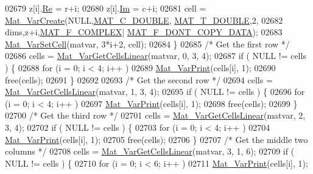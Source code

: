\begin{DoxyCode}
{{{{{{{{02679         z[i].\hyperlink{group___m_a_t_a484a93607508adac2bce53a0252e0325}{Re} = r+i;
02680         z[i].\hyperlink{group___m_a_t_a7182d10b0d3598415887376065440946}{Im} = c+i;
02681         cell = \hyperlink{group___m_a_t_ga1c54a84bb4d810c6fccdb8869489eac4}{Mat\_VarCreate}(NULL,\hyperlink{group___m_a_t_ggad4d60ae7b709fc81bfd744fb4c857c40a5d70e0862e5bdb7bd86bf7ba5948f307}{MAT\_C\_DOUBLE},
      \hyperlink{group___m_a_t_ggacf7b3b879282b7ab3a51190e49bf3453a31e721ecf7e188196f83c32838288797}{MAT\_T\_DOUBLE},2,
02682                              dims,z+i,\hyperlink{group___m_a_t_ggab9d6ef9e3ddca78a317b173f01d53fbbacd7b091a11184aad7fc6078c04470780}{MAT\_F\_COMPLEX}|
      \hyperlink{group___m_a_t_ggab9d6ef9e3ddca78a317b173f01d53fbba762244499f52eb35e7b53fb79a1f2889}{MAT\_F\_DONT\_COPY\_DATA});
02683         \hyperlink{group___m_a_t_ga1b2c36f27ba592206c22c584a30a3c5c}{Mat\_VarSetCell}(matvar, 3*i+2, cell);
02684     \}
02685     \textcolor{comment}{/* Get the first row */}
02686     cells = \hyperlink{group___m_a_t_ga004987d665654409f74eaf8e82bb1380}{Mat\_VarGetCellsLinear}(matvar, 0, 3, 4);
02687     \textcolor{keywordflow}{if} ( NULL != cells ) \{
02688         \textcolor{keywordflow}{for} (i = 0; i < 4; i++ )
02689             \hyperlink{group___m_a_t_ga9100c145e338b84b55d5d0795d5d390a}{Mat\_VarPrint}(cells[i], 1);
02690         free(cells);
02691     \}
02692 
02693     \textcolor{comment}{/* Get the second row */}
02694     cells = \hyperlink{group___m_a_t_ga004987d665654409f74eaf8e82bb1380}{Mat\_VarGetCellsLinear}(matvar, 1, 3, 4);
02695     \textcolor{keywordflow}{if} ( NULL != cells ) \{
02696         \textcolor{keywordflow}{for} (i = 0; i < 4; i++ )
02697             \hyperlink{group___m_a_t_ga9100c145e338b84b55d5d0795d5d390a}{Mat\_VarPrint}(cells[i], 1);
02698         free(cells);
02699     \}
02700     \textcolor{comment}{/* Get the third row */}
02701     cells = \hyperlink{group___m_a_t_ga004987d665654409f74eaf8e82bb1380}{Mat\_VarGetCellsLinear}(matvar, 2, 3, 4);
02702     \textcolor{keywordflow}{if} ( NULL != cells ) \{
02703         \textcolor{keywordflow}{for} (i = 0; i < 4; i++ )
02704             \hyperlink{group___m_a_t_ga9100c145e338b84b55d5d0795d5d390a}{Mat\_VarPrint}(cells[i], 1);
02705         free(cells);
02706     \}
02707     \textcolor{comment}{/* Get the middle two columns */}
02708     cells = \hyperlink{group___m_a_t_ga004987d665654409f74eaf8e82bb1380}{Mat\_VarGetCellsLinear}(matvar, 3, 1, 6);
02709     \textcolor{keywordflow}{if} ( NULL != cells ) \{
02710         \textcolor{keywordflow}{for} (i = 0; i < 6; i++ )
02711             \hyperlink{group___m_a_t_ga9100c145e338b84b55d5d0795d5d390a}{Mat\_VarPrint}(cells[i], 1);
}}}}}}}}
\end{DoxyCode}
